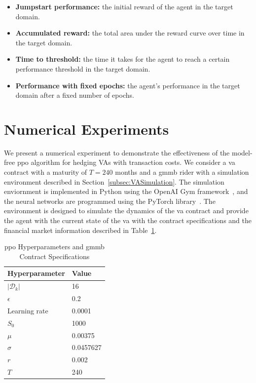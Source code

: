 \begin{itemize}
    \item \textbf{Jumpstart performance:} the initial reward of the agent in the target domain.
    \item \textbf{Accumulated reward:} the total area under the reward curve over time in the target domain.
    \item \textbf{Time to threshold:} the time it takes for the agent to reach a certain performance threshold in the target domain.
    \item \textbf{Performance with fixed epochs:} the agent's performance in the target domain after a fixed number of epochs.
\end{itemize}

\section{Numerical Experiments} \label{sec:Experiments}

We present a numerical experiment to demonstrate the effectiveness of the model-free \gls{ppo} algorithm for hedging VAs with transaction costs.
We consider a \gls{va} contract with a maturity of $T=240$ months and a \gls{gmmb} rider with a simulation environment described in Section~\ref{subsec:VASimulation}.
The simulation enviornment is implemented in Python using the OpenAI Gym framework~\citep{brockman2016openai}, and the neural networks are programmed using the PyTorch library~\citep{paszke2019pytorch}.
The environment is designed to simulate the dynamics of the \gls{va} contract and provide the agent with the current state of the \gls{va} with the contract specifications and the financial market information described in Table~\ref{tab3:hyperparameters}.

\begin{table}[ht!]
    \centering
    \begin{tabular}{ll} 
        \toprule
        Hyperparameter      & Value \\
        \midrule
        $|\mathcal{D}_k|$   & 16        \\
        $\epsilon$          & 0.2       \\
        Learning rate       & 0.0001    \\
        $S_0$               & 1000      \\
        $\mu$               & 0.00375   \\
        $\sigma$            & 0.0457627 \\
        $r$                 & 0.002     \\
        $T$                 & 240       \\
        \bottomrule
    \end{tabular}
    \caption{\gls{ppo} Hyperparameters and \gls{gmmb} Contract Specifications} 
    \label{tab3:hyperparameters}
\end{table}

